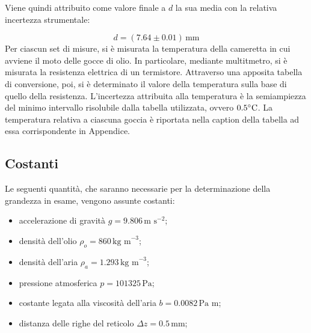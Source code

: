\documentclass[]{article}
\let\oldsubsection\subsection%
\renewcommand{\subsection}{%
	\renewcommand{\theequation}{\thesubsection.\arabic{equation}}%
	\oldsubsection}%
\begin{document}
    Viene quindi attribuito come valore finale a $ d $ la sua media con la relativa incertezza strumentale:

    \begin{equation}
        \label{misura_Rb}
        d = (7.64 \pm 0.01) \, \text{mm}
    \end{equation} 
    Per ciascun set di misure, si è misurata la temperatura della cameretta in cui avviene il moto delle gocce di olio. In particolare, mediante multitmetro, si è misurata la resistenza elettrica di un termistore. Attraverso una apposita tabella di conversione, poi, si è determinato il valore della temperatura sulla base di quello della resistenza. L'incertezza attribuita alla temperatura è la semiampiezza del minimo intervallo risolubile dalla tabella utilizzata, ovvero $0.5 \degree \text{C}$.
    La temperatura relativa a ciascuna goccia è riportata nella caption della tabella ad essa corrispondente in Appendice.

    \subsection {Costanti}
    \label{par:costanti}

    Le seguenti quantità, che saranno necessarie per la determinazione della grandezza in esame, vengono assunte costanti:
    \begin{itemize}
        \item accelerazione di gravità $g = 9.806 \, \text{m s}^{-2}$;
        \item densità dell'olio $\rho_o = 860 \, \text{kg m}^{-3}$;
        \item densità dell'aria $\rho_a = 1.293 \, \text{kg m}^{-3}$;
        \item pressione atmosferica $ p = 101325 \, \text{Pa}$;
        \item costante legata alla viscosità dell'aria $b = 0.0082 \,  \text{Pa m}$;
        \item distanza delle righe del reticolo $ \Delta z = 0.5 \, \text{mm}$;
    \end{itemize}
\end{document}
